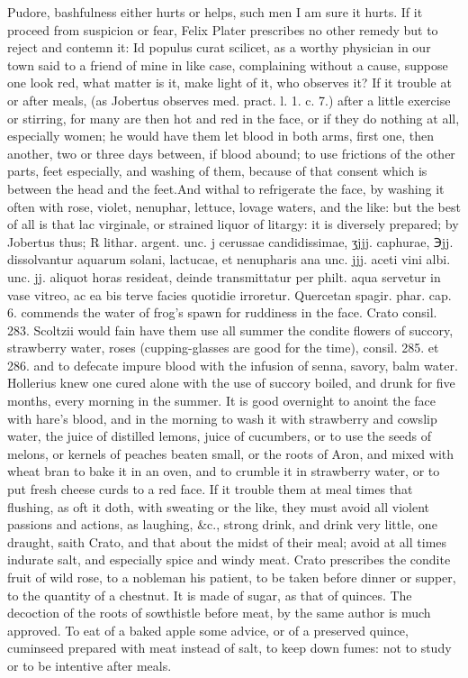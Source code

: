 Pudore, bashfulness either hurts or helps, such men I am sure it hurts.
If it proceed from suspicion or fear, Felix Plater prescribes no
other remedy but to reject and contemn it: Id populus curat scilicet,
as a worthy physician in our town said to a friend of mine in
like case, complaining without a cause, suppose one look red, what
matter is it, make light of it, who observes it?
If it trouble at or after meals, (as Jobertus observes med.
pract. l. 1. c. 7.) after a little exercise or stirring, for many are
then hot and red in the face, or if they do nothing at all, especially
women; he would have them let blood in both arms, first one, then
another, two or three days between, if blood abound; to use frictions
of the other parts, feet especially, and washing of them, because of
that consent which is between the head and the feet.And withal to
refrigerate the face, by washing it often with rose, violet, nenuphar,
lettuce, lovage waters, and the like: but the best of all is that lac
virginale, or strained liquor of litargy: it is diversely prepared; by
Jobertus thus; ℞ lithar. argent. unc. j cerussae candidissimae, ʒjjj.
caphurae, ℈jj. dissolvantur aquarum solani, lactucae, et nenupharis ana
unc. jjj. aceti vini albi. unc. jj. aliquot horas resideat, deinde
transmittatur per philt. aqua servetur in vase vitreo, ac ea bis terve
facies quotidie irroretur. Quercetan spagir. phar. cap. 6.
commends the water of frog's spawn for ruddiness in the face.
Crato consil. 283. Scoltzii would fain have them use all summer
the condite flowers of succory, strawberry water, roses
(cupping-glasses are good for the time), consil. 285. et 286. and to
defecate impure blood with the infusion of senna, savory, balm water.
Hollerius knew one cured alone with the use of succory boiled,
and drunk for five months, every morning in the summer. It is
good overnight to anoint the face with hare's blood, and in the morning
to wash it with strawberry and cowslip water, the juice of distilled
lemons, juice of cucumbers, or to use the seeds of melons, or kernels
of peaches beaten small, or the roots of Aron, and mixed with wheat
bran to bake it in an oven, and to crumble it in strawberry water,
 or to put fresh cheese curds to a red face.
If it trouble them at meal times that flushing, as oft it doth, with
sweating or the like, they must avoid all violent passions and actions,
as laughing, \&c., strong drink, and drink very little, one
draught, saith Crato, and that about the midst of their meal; avoid at
all times indurate salt, and especially spice and windy meat.
Crato prescribes the condite fruit of wild rose, to a nobleman
his patient, to be taken before dinner or supper, to the quantity of a
chestnut. It is made of sugar, as that of quinces. The decoction of the
roots of sowthistle before meat, by the same author is much approved.
To eat of a baked apple some advice, or of a preserved quince,
cuminseed prepared with meat instead of salt, to keep down fumes: not
to study or to be intentive after meals.

